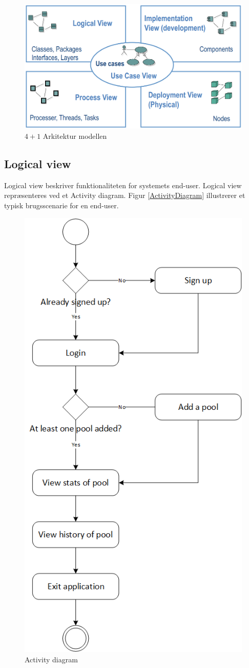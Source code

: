 \begin{figure}[h]
	\centering
	\includegraphics[width=0.9\linewidth]{figs/arkitektur/41model}
	\caption{$4+1$ Arkitektur modellen \cite{flylib}}
	\label{fig:41model}
\end{figure}

\subsection{Logical view}
Logical view beskriver funktionaliteten for systemets end-user. Logical view repræsenteres ved et Activity diagram. Figur \ref{ActivityDiagram} illustrerer et typisk brugsscenarie for en end-user. 
\begin{figure}
\centering
\includegraphics[width=0.55\linewidth]{figs/arkitektur/ActivityDiagram.PNG}
\caption{Activity diagram}
\label{fig:ActivityDiagram}
\end{figure}

